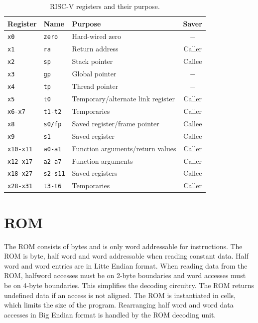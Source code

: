 \documentclass[12pt]{article}
\begin{document}
\begin{table}[!ht]
\centering
\caption{RISC-V registers and their purpose.}
\label{tab:registers}
\begin{tabular}{lllc}
Register & Name & Purpose & Saver \\
\midrule
\texttt{x0}      & \texttt{zero}   & Hard-wired zero                   & $-$ \\
\texttt{x1}      & \texttt{ra}     & Return address                    & Caller \\
\texttt{x2}      & \texttt{sp}     & Stack pointer                     & Callee \\
\texttt{x3}      & \texttt{gp}     & Global pointer                    & $-$ \\
\texttt{x4}      & \texttt{tp}     & Thread pointer                    & $-$ \\
\texttt{x5}      & \texttt{t0}     & Temporary/alternate link register & Caller \\
\texttt{x6-x7}   & \texttt{t1-t2}  & Temporaries                       & Caller \\
\texttt{x8}      & \texttt{s0/fp}  & Saved register/frame pointer      & Callee \\
\texttt{x9}      & \texttt{s1}     & Saved register                    & Callee \\
\texttt{x10-x11} & \texttt{a0-a1}  & Function arguments/return values  & Caller \\
\texttt{x12-x17} & \texttt{a2-a7}  & Function arguments                & Caller \\
\texttt{x18-x27} & \texttt{s2-s11} & Saved registers                   & Callee \\
\texttt{x28-x31} & \texttt{t3-t6}  & Temporaries                       & Caller
\end{tabular}
\end{table}

\section{ROM}
\label{sec:rom}
The ROM consists of bytes and is only word addressable for instructions. The ROM is byte, half word and word addressable when reading constant data. Half word and word entries are in Litte Endian format. When reading data from the ROM, halfword accesses must be on 2-byte boundaries and word accesses must be on 4-byte boundaries. This simplifies the decoding circuitry. The ROM returns undefined data if an access is not aligned. The ROM is instantiated in cells, which limits the size of the program. Rearranging half word and word data accesses in Big Endian format is handled by the ROM decoding unit.
\end{document}

